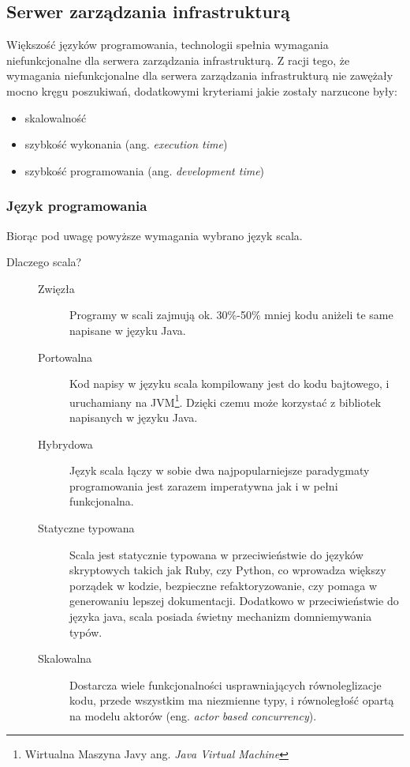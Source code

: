 \subsection{Serwer zarządzania infrastrukturą}

Większość języków programowania, technologii spełnia wymagania niefunkcjonalne dla serwera zarządzania infrastrukturą. Z racji tego, że wymagania niefunkcjonalne dla serwera zarządzania infrastrukturą nie zawężały mocno kręgu poszukiwań, dodatkowymi kryteriami jakie zostały narzucone były:

\begin{itemize}
	\item skalowalność
	\item szybkość wykonania (ang. \emph{execution time})
	\item szybkość programowania (ang. \emph{development time})
\end{itemize}

\subsubsection{Język programowania}

Biorąc pod uwagę powyższe wymagania wybrano język scala.


\begin{description}
	\item[Dlaczego scala?] \hfill \par 
	\begin{description}
		\item[Zwięzła] \hfill \par
			Programy w scali zajmują ok. 30\%-50\% mniej kodu aniżeli te same napisane w języku Java.
		\item[Portowalna] \hfill \par
			Kod napisy w języku scala kompilowany jest do kodu bajtowego, i uruchamiany na JVM\footnote{Wirtualna Maszyna Javy ang. \emph{Java Virtual Machine}}. Dzięki czemu może korzystać z bibliotek napisanych w języku Java.
		\item[Hybrydowa] \hfill \par
			Język scala łączy w sobie dwa najpopularniejsze paradygmaty programowania jest zarazem imperatywna jak i w pełni funkcjonalna.
		\item[Statyczne typowana] \hfill \par
			Scala jest statycznie typowana w przeciwieństwie do języków skryptowych takich jak Ruby, czy Python, co wprowadza większy porządek w kodzie, bezpieczne refaktoryzowanie, czy pomaga w generowaniu lepszej dokumentacji. Dodatkowo w przeciwieństwie do języka java, scala posiada świetny mechanizm domniemywania typów.
		\item[Skalowalna] \hfill \par
			Dostarcza wiele funkcjonalności usprawniających równoleglizacje kodu, przede wszystkim ma niezmienne typy, i równoległość opartą na modelu aktorów (eng. \emph{actor based concurrency}).
	\end{description}
\end{description}


